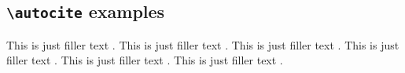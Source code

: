 \documentclass[a4paper]{article}
\newcommand{\cmd}[1]{\texttt{\textbackslash #1}}
\begin{document}
\clearpage

\subsection*{\cmd{autocite} examples}


This is just filler text \autocite{aristotle:rhetoric}.
This is just filler text \autocite{averroes/bland}.
This is just filler text \autocite{aristotle:rhetoric}.
This is just filler text \autocite{aristotle:anima}.
This is just filler text \autocite{aristotle:physics}.
This is just filler text \autocite{aristotle:physics}.

\clearpage


\printshorthands
\printbibliography
\end{document}
